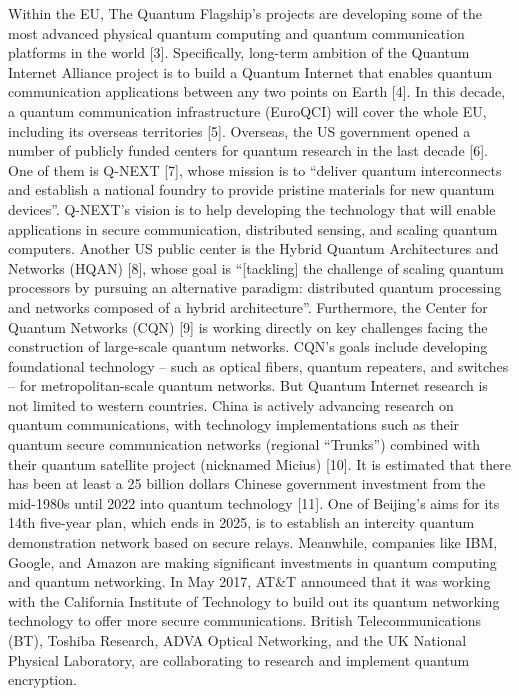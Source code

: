 Within the EU, The Quantum Flagship’s projects are developing some of the most advanced physical quantum computing and quantum communication platforms in the world [3]. Specifically, long-term ambition of the Quantum Internet Alliance project is to build a Quantum Internet that enables quantum communication applications between any two points on Earth [4]. In this decade, a quantum communication infrastructure (EuroQCI) will cover the whole EU, including its overseas territories [5]. Overseas, the US government opened a number of publicly funded centers for quantum research in the last decade [6]. One of them is Q-NEXT [7], whose mission is to “deliver quantum interconnects and establish a national foundry to provide pristine materials for new quantum devices”. Q-NEXT’s vision is to help developing the technology that will enable applications in secure communication, distributed sensing, and scaling quantum computers. Another US public center is the Hybrid Quantum Architectures and Networks (HQAN) [8], whose goal is “[tackling] the challenge of scaling quantum processors by pursuing an alternative paradigm: distributed quantum processing and networks composed of a hybrid architecture”. Furthermore, the Center for Quantum Networks (CQN) [9] is working directly on key challenges facing the construction of large-scale quantum networks. CQN’s goals include developing foundational technology – such as optical fibers, quantum repeaters, and switches – for metropolitan-scale quantum networks. But Quantum Internet research is not limited to western countries. China is actively advancing research on quantum communications, with technology implementations such as their quantum secure communication networks (regional “Trunks”) combined with their quantum satellite project (nicknamed Micius) [10]. It is estimated that there has been at least a 25 billion dollars Chinese government investment from the mid-1980s until 2022 into quantum technology [11]. One of Beijing’s aims for its 14th five-year plan, which ends in 2025, is to establish an intercity quantum demonstration network based on secure relays. Meanwhile, companies like IBM, Google, and Amazon are making significant investments in quantum computing and quantum networking. In May 2017, AT&T announced that it was working with the California Institute of Technology to build out its quantum networking technology to offer more secure communications. British Telecommunications (BT), Toshiba Research, ADVA Optical Networking, and the UK National Physical Laboratory, are collaborating to research and implement quantum encryption. 

